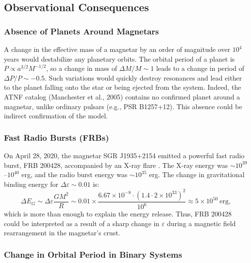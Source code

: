 \documentclass[12pt]{article}
\theoremstyle{remark}
\newcommand{\eps}{\varepsilon}
\begin{document}
	\subsection{Observational Consequences}
	\label{subsec:magnetars-consequences}
	
	\subsubsection{Absence of Planets Around Magnetars}
	\label{subsubsec:magnetars-planets}
	
	A change in the effective mass of a magnetar by an order of magnitude over $10^4$ years would destabilize any planetary orbits. The orbital period of a planet is $P \propto a^{3/2} M^{-1/2}$, so a change in mass of $\Delta M/M \sim 1$ leads to a change in period of $\Delta P/P \sim -0.5$. Such variations would quickly destroy resonances and lead either to the planet falling onto the star or being ejected from the system. Indeed, the ATNF catalog (Manchester et al., 2005) contains no confirmed planet around a magnetar, unlike ordinary pulsars (e.g., PSR B1257+12). This absence could be indirect confirmation of the model.
	
	\subsubsection{Fast Radio Bursts (FRBs)}
	\label{subsubsec:magnetars-frb}
	
	On April 28, 2020, the magnetar SGR J1935+2154 emitted a powerful fast radio burst, FRB 200428, accompanied by an X-ray flare \cite{Geng2020}. The X-ray energy was $\sim 10^{39}$–$10^{40}$ erg, and the radio burst energy was $\sim 10^{35}$ erg. The change in gravitational binding energy for $\Delta\eps \sim 0.01$ is:
	\begin{equation}
		\Delta E_G \sim \Delta\eps \frac{GM^2}{R} \sim 0.01 \times \frac{6.67\times10^{-8} \cdot (1.4\cdot 2\times10^{33})^2}{10^6} \approx 5\times10^{50}\ \text{erg},
	\end{equation}
	which is more than enough to explain the energy release. Thus, FRB 200428 could be interpreted as a result of a sharp change in $\eps$ during a magnetic field rearrangement in the magnetar's crust.
	
	\subsubsection{Change in Orbital Period in Binary Systems}
	\label{subsubsec:magnetars-binary}
	
\end{document}
